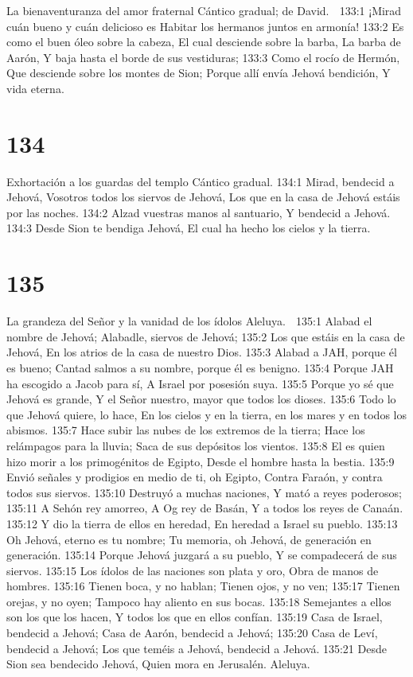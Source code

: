 La bienaventuranza del amor fraternal 
Cántico gradual; de David. 

133:1 ¡Mirad cuán bueno y cuán delicioso es 
Habitar los hermanos juntos en armonía! 
133:2 Es como el buen óleo sobre la cabeza, 
El cual desciende sobre la barba, 
La barba de Aarón, 
Y baja hasta el borde de sus vestiduras; 
133:3 Como el rocío de Hermón, 
Que desciende sobre los montes de Sion; 
Porque allí envía Jehová bendición, 
Y vida eterna. 

\chapter{134}

Exhortación a los guardas del templo 
Cántico gradual. 
134:1 Mirad, bendecid a Jehová, 
Vosotros todos los siervos de Jehová, 
Los que en la casa de Jehová estáis por las noches. 
134:2 Alzad vuestras manos al santuario, 
Y bendecid a Jehová. 
134:3 Desde Sion te bendiga Jehová, 
El cual ha hecho los cielos y la tierra. 

\chapter{135}

La grandeza del Señor y la vanidad de los ídolos 
Aleluya. 

135:1 Alabad el nombre de Jehová; 
Alabadle, siervos de Jehová; 
135:2 Los que estáis en la casa de Jehová, 
En los atrios de la casa de nuestro Dios. 
135:3 Alabad a JAH, porque él es bueno; 
Cantad salmos a su nombre, porque él es benigno. 
135:4 Porque JAH ha escogido a Jacob para sí, 
A Israel por posesión suya. 
135:5 Porque yo sé que Jehová es grande, 
Y el Señor nuestro, mayor que todos los dioses. 
135:6 Todo lo que Jehová quiere, lo hace, 
En los cielos y en la tierra, en los mares y en todos los abismos. 
135:7 Hace subir las nubes de los extremos de la tierra; 
Hace los relámpagos para la lluvia; 
Saca de sus depósitos los vientos. 
135:8 El es quien hizo morir a los primogénitos de Egipto, 
Desde el hombre hasta la bestia. 
135:9 Envió señales y prodigios en medio de ti, oh Egipto, 
Contra Faraón, y contra todos sus siervos. 
135:10 Destruyó a muchas naciones, 
Y mató a reyes poderosos; 
135:11 A Sehón rey amorreo, 
A Og rey de Basán, 
Y a todos los reyes de Canaán. 
135:12 Y dio la tierra de ellos en heredad, 
En heredad a Israel su pueblo. 
135:13 Oh Jehová, eterno es tu nombre; 
Tu memoria, oh Jehová, de generación en generación. 
135:14 Porque Jehová juzgará a su pueblo, 
Y se compadecerá de sus siervos. 
135:15 Los ídolos de las naciones son plata y oro, 
Obra de manos de hombres. 
135:16 Tienen boca, y no hablan; 
Tienen ojos, y no ven; 
135:17 Tienen orejas, y no oyen; 
Tampoco hay aliento en sus bocas. 
135:18 Semejantes a ellos son los que los hacen, 
Y todos los que en ellos confían. 
135:19 Casa de Israel, bendecid a Jehová; 
Casa de Aarón, bendecid a Jehová; 
135:20 Casa de Leví, bendecid a Jehová; 
Los que teméis a Jehová, bendecid a Jehová. 
135:21 Desde Sion sea bendecido Jehová, 
Quien mora en Jerusalén. 
Aleluya. 

